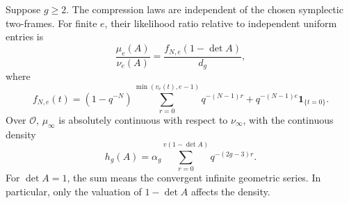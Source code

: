 \begin{theorem}
\label{thm:padic-density}
Suppose $g\geq2$. The compression laws are independent of the chosen
symplectic two-frames. For finite $e$, their likelihood ratio relative
to independent uniform entries is
\begin{equation}\label{eq:padic-finite-density}
 \frac{\mu_e(A)}{\nu_e(A)}
 =\frac{f_{N,e}(1-\det A)}{d_g},
\end{equation}
where
\begin{equation}\label{eq:padic-finite-f}
 f_{N,e}(t)=
 (1-q^{-N})\sum_{r=0}^{\min(v_e(t),e-1)}q^{-(N-1)r}
 +q^{-(N-1)e}\mathbf 1_{\{t=0\}}.
\end{equation}
Over $\mathcal O$, $\mu_\infty$ is absolutely continuous with respect
to $\nu_\infty$, with the continuous density
\begin{equation}\label{eq:padic-infinite-density}
 h_g(A)=\alpha_g\sum_{r=0}^{v(1-\det A)}q^{-(2g-3)r}.
\end{equation}
For $\det A=1$, the sum means the convergent infinite geometric series.
In particular, only the valuation of $1-\det A$ affects the density.
\end{theorem}

